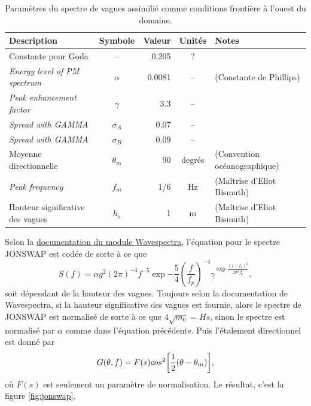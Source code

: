\documentclass[10pt]{article}
\numberwithin{equation}{section}
\begin{document}
\begin{table}[htbp]
\caption{\label{tab:org729db58}Paramètres du spectre de vagues assimilié comme conditions frontière à l'ouest du domaine.}
\centering
\begin{tabular}{lcrcl}
\hline
\hline
Description & Symbole & Valeur & Unités & Notes\\
\hline
Constante pour Goda & -- & 0.205 & ? & \Textcite{goda1988variablity}\\
\emph{Energy level of PM spectrum} & \(\alpha\) & 0.0081 & -- & \Textcite{wwiii2016user} (Constante de Phillips)\\
\emph{Peak enhancement factor} & \(\gamma\) & 3.3 & -- & \Textcite{hasselmann1973measurements,wwiii2016user}\\
\emph{Spread with GAMMA} & \(\sigma_A\) & 0.07 & -- & \Textcite{hasselmann1973measurements,wwiii2016user}\\
\emph{Spread with GAMMA} & \(\sigma_B\) & 0.09 & -- & \Textcite{hasselmann1973measurements,wwiii2016user}\\
Moyenne directionnelle & \(\theta_m\) & 90 & degrés & \Textcite{wwiii2016user} (Convention océanographique)\\
\hline
\emph{Peak frequency} & \(f_m\) & 1/6 & Hz & (Maîtrise d'Eliot Bismuth)\\
Hauteur significative des vagues & \(h_s\) & 1 & m & (Maîtrise d'Eliot Bismuth)\\
\hline
\end{tabular}
\end{table}


Selon la \href{https://wavespectra.readthedocs.io/en/latest/construction.html\#jonswap}{documentation du module Wavespectra}, l'équation pour le spectre JONSWAP \autocite{hasselmann1973measurements} est codée de sorte à ce que 
\begin{equation}
   S(f) = \alpha g^2 (2\pi)^{-4} f^{-5} \exp{-\frac{5}{4} \left (\frac{f}{f_p} \right)^{-4} } \gamma^{\exp{\frac{(f-f_p)^2}{2\sigma^2f_p^2}}},
\end{equation}
soit dépendant de la hauteur des vagues. Toujours selon la documentation de Wavespectra, si la hauteur significative des vagues est fournie, alors le spectre de JONSWAP est normalisé de sorte à ce que \(4\sqrt{m_0} = Hs\), sinon le spectre est normalisé par \(\alpha\) comme dans l'équation précédente.
Puis l'étalement directionnel est donné par
\begin{equation}
   G(\theta,f)=F(s)cos^2\qty[\frac{1}{2}(\theta-\theta_{m})],
\end{equation}
où \(F(s)\) est seulement un paramètre de normalisation. Le résultat, c'est la figure \ref{fig:jonswap}.
\end{document}
